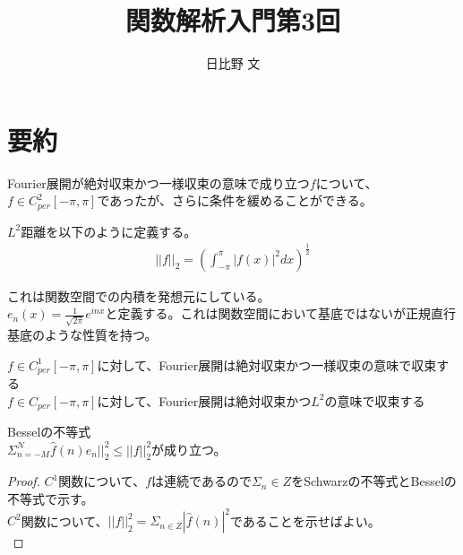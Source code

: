 \documentclass[12pt,a4paper]{ltjsarticle}
\begin{document}
\title{関数解析入門第3回}
\author{日比野 文}
\maketitle

\section{要約}
Fourier展開が絶対収束かつ一様収束の意味で成り立つ$f$について、$f \in C^2_{per} [-\pi, \pi]$であったが、さらに条件を緩めることができる。\\
\begin{dfn}
  $L^2$距離を以下のように定義する。
  \begin{align*}
    ||f||_2 = (\int^{\pi}_{-\pi} |f(x)|^2 dx)^{\frac{1}{2}}
  \end{align*}
\end{dfn}
これは関数空間での内積を発想元にしている。\\
  $e_n(x) = \frac{1}{\sqrt{2\pi}} e^{inx}$と定義する。これは関数空間において基底ではないが正規直行基底のような性質を持つ。
\begin{prop}
  $f\in C^1_{per} [-\pi, \pi]$に対して、Fourier展開は絶対収束かつ一様収束の意味で収束する\\
  $f \in C_{per} [-\pi, \pi]$に対して、Fourier展開は絶対収束かつ$L^2$の意味で収束する
\end{prop}
\begin{lem}{Besselの不等式}\\
  $\Sigma^N_{n=-M} \hat{f}(n)e_n||^2_2 \le ||f||^2_2$が成り立つ。
  \end{lem}
\begin{proof}
  $C^1$関数について、$f$は連続であるので$\Sigma_n\in Z$をSchwarzの不等式とBesselの不等式で示す。\\
  $C^2$関数について、$||f||^2_2 = \Sigma_{n\in Z} |\hat{f}(n)|^2$であることを示せばよい。\\
\end{proof}
\end{document}
